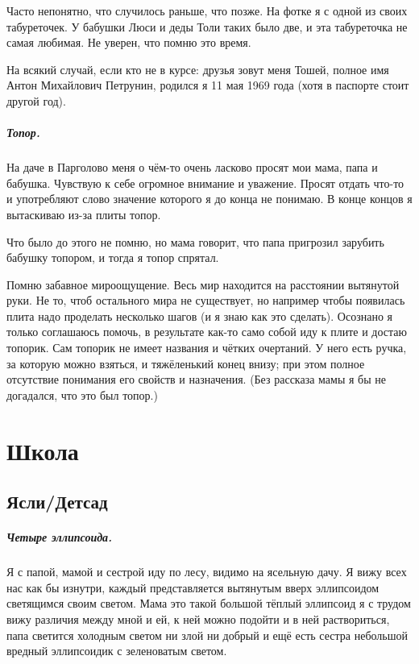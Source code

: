 \documentclass{book}
\begin{document}
Часто непонятно, что случилось раньше, что позже.
На фотке я с одной из своих табуреточек.
У бабушки Люси и деды Толи таких было две, и эта табуреточка не самая любимая.
Не уверен, что помню это время.

На всякий случай, если кто не в курсе: друзья зовут меня Тошей, полное имя Антон Михайлович Петрунин, родился я 11 мая 1969 года (хотя в паспорте стоит другой год).

\paragraph{Топор.}
На даче в Парголово меня о чём-то очень ласково просят мои мама, папа и бабушка.
Чувствую к себе огромное внимание и уважение.
Просят отдать что-то и употребляют слово значение которого я до конца не понимаю.
В конце концов я вытаскиваю из-за плиты топор.

Что было до этого не помню, но мама говорит, что папа пригрозил зарубить бабушку топором,
и тогда я топор спрятал.

Помню забавное мироощущение. 
Весь мир находится на расстоянии вытянутой руки.
Не то, чтоб остального мира не существует, но например чтобы появилась плита надо проделать несколько шагов (и я знаю как это сделать).
Осознано я только соглашаюсь помочь, в результате как-то само собой иду к плите и достаю топорик.
Сам топорик не имеет названия и чётких очертаний.
У него есть ручка, за которую можно взяться, и тяжёленький конец внизу; при этом полное отсутствие понимания его свойств и назначения.
(Без рассказа мамы я бы не догадался, что это был топор.)

\chapter*{Школа}

\section*{Ясли/Детсад}

\paragraph{Четыре эллипсоида.}
Я с папой, мамой и сестрой иду по лесу, видимо на ясельную дачу.
Я вижу всех нас как бы изнутри, каждый представляется вытянутым вверх эллипсоидом светящимся своим светом.
Мама это такой большой тёплый эллипсоид я с трудом вижу различия между мной и ей, к ней можно подойти и в ней раствориться, папа светится холодным светом ни злой ни добрый и ещё есть сестра небольшой вредный эллипсоидик с зеленоватым светом.
\end{document}
